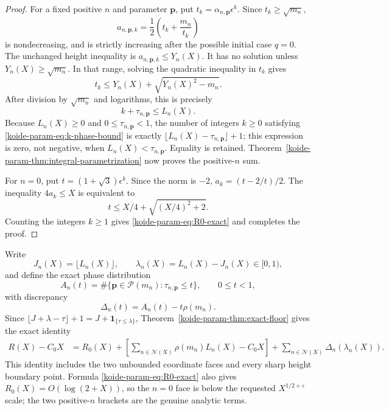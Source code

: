 \begin{proof}
For a fixed positive $n$ and parameter $\mathbf p$, put
$t_k=\alpha_{n,\mathbf p}\epsilon^k$.  Since
$t_k\geq\sqrt{m_n}$,
\begin{equation}
 a_{n,\mathbf p,k}=\frac12\left(t_k+\frac{m_n}{t_k}\right)
 \label{koide-param-eq:a-from-t}
\end{equation}
is nondecreasing, and is strictly increasing after the possible initial
case $q=0$.  The unchanged height inequality is
$a_{n,\mathbf p,k}\leq Y_n(X)$.  It has no solution unless
$Y_n(X)\geq\sqrt{m_n}$.  In that range, solving the quadratic inequality
in $t_k$ gives
\begin{equation}
 t_k\leq Y_n(X)+\sqrt{Y_n(X)^2-m_n}.
 \label{koide-param-eq:t-height-bound}
\end{equation}
After division by $\sqrt{m_n}$ and logarithms, this is precisely
\begin{equation}
 k+\tau_{n,\mathbf p}\leq L_n(X).
 \label{koide-param-eq:k-phase-bound}
\end{equation}
Because $L_n(X)\geq0$ and $0\leq\tau_{n,\mathbf p}<1$, the number of
integers $k\geq0$ satisfying \eqref{koide-param-eq:k-phase-bound} is exactly
$\lfloor L_n(X)-\tau_{n,\mathbf p}\rfloor+1$; this expression is zero,
not negative, when $L_n(X)<\tau_{n,\mathbf p}$.  Equality is retained.
Theorem~\ref{koide-param-thm:integral-parametrization} now proves the positive-$n$
sum.

For $n=0$, put $t=(1+\sqrt3)\epsilon^k$.  Since the norm is $-2$,
$a_k=(t-2/t)/2$.  The inequality $4a_k\leq X$ is equivalent to
\[
 t\leq X/4+\sqrt{(X/4)^2+2}.
\]
Counting the integers $k\geq1$ gives \eqref{koide-param-eq:R0-exact} and completes
the proof.
\end{proof}

Write
\begin{equation}
 J_n(X)=\lfloor L_n(X)\rfloor,
 \qquad
 \lambda_n(X)=L_n(X)-J_n(X)\in[0,1),
 \label{koide-param-eq:J-lambda}
\end{equation}
and define the exact phase distribution
\begin{equation}
 A_n(t)=\#\{\mathbf p\in\mathcal P(m_n):
                     \tau_{n,\mathbf p}\leq t\},
 \qquad0\leq t<1,
 \label{koide-param-eq:A-n}
\end{equation}
with discrepancy
\begin{equation}
 \Delta_n(t)=A_n(t)-t\rho(m_n).
 \label{koide-param-eq:Delta-n}
\end{equation}
Since
\(\lfloor J+\lambda-\tau\rfloor+1
=J+\mathbf1_{\{\tau\leq\lambda\}}\), Theorem~\ref{koide-param-thm:exact-floor}
gives the exact identity
\begin{align}
 R(X)-C_0X
 &=R_0(X)
 +\left[
   \sum_{n\in\mathcal N(X)}
     \rho(m_n)L_n(X)-C_0X
  \right]
 +\sum_{n\in\mathcal N(X)}
    \Delta_n(\lambda_n(X)).
 \label{koide-param-eq:exact-discrepancy-splitting}
\end{align}
This identity includes the two unbounded coordinate faces and every sharp
height boundary point.  Formula \eqref{koide-param-eq:R0-exact} also gives
$R_0(X)=O(\log(2+X))$, so the $n=0$ face is below the requested
$X^{1/2+\varepsilon}$ scale; the two positive-$n$ brackets are the genuine
analytic terms.

